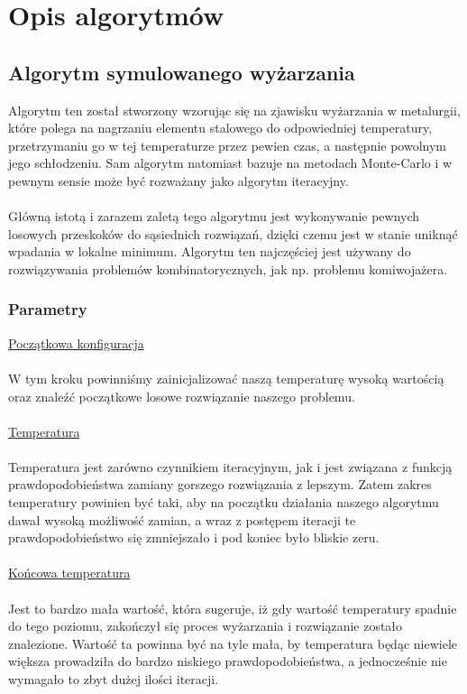 \documentclass[12pt]{report}
\newcommand{\newLine}{~\\}
\newcommand{\si}{ś}
\begin{document}
{	\chapter{Opis algorytmów}
		\section{Algorytm symulowanego wyżarzania}
	Algorytm ten został stworzony wzorując się na zjawisku wyżarzania w metalurgii, które polega na nagrzaniu elementu stalowego do odpowiedniej temperatury, przetrzymaniu go w tej temperaturze przez pewien czas, a następnie powolnym jego schłodzeniu. Sam algorytm natomiast bazuje na metodach Monte-Carlo i w pewnym sensie może być rozważany jako algorytm iteracyjny.\\ \newLine
Główną istotą i zarazem zaletą tego algorytmu jest wykonywanie pewnych losowych przeskoków do sąsiednich rozwiązań, dzięki czemu jest w stanie uniknąć wpadania w lokalne minimum. Algorytm ten najczę\si ciej jest używany do rozwiązywania problemów kombinatorycznych, jak np. problemu komiwojażera.
			\subsection{Parametry}

\noindent \underline{Początkowa konfiguracja} \\ \newLine
\indent W tym kroku powinniśmy zainicjalizować naszą temperaturę wysoką wartością oraz znaleźć początkowe losowe rozwiązanie naszego problemu. 
\\ \newLine

\noindent \underline{Temperatura} \\ \newLine
\indent Temperatura jest zarówno czynnikiem iteracyjnym, jak i jest związana z funkcją prawdopodobieństwa zamiany gorszego rozwiązania z lepszym. Zatem zakres temperatury powinien być taki, aby na początku działania naszego algorytmu dawał wysoką możliwość zamian, a wraz z postępem iteracji te prawdopodobieństwo się zmniejszało i pod koniec było bliskie zeru.\\ \newLine


\noindent \underline{Końcowa temperatura} \\ \newLine
\indent Jest to bardzo mała wartość, która sugeruje, iż gdy wartość temperatury spadnie do tego poziomu, zakończył się proces wyżarzania i rozwiązanie zostało znalezione. Wartość ta powinna być na tyle mała, by temperatura będąc niewiele większa prowadziła do bardzo niskiego prawdopodobieństwa, a jednocze\si nie nie wymagało to zbyt dużej ilo\si ci iteracji. \\ \newLine


}
\end{document}
